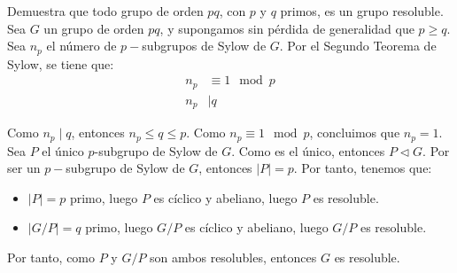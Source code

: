 \begin{ejercicio}\label{ej:5.15}
    Demuestra que todo grupo de orden $pq$, con $p$ y $q$ primos, es un grupo resoluble.\\

    Sea $G$ un grupo de orden $pq$, y supongamos sin pérdida de generalidad que $p\geq q$. Sea $n_p$ el número de $p-$subgrupos de Sylow de $G$. Por el Segundo Teorema de Sylow, se tiene que:
    \begin{align*}
        n_p &\equiv 1 \mod p \\
        n_p &\mid q
    \end{align*}

    Como $n_p\mid q$, entonces $n_p\leq q\leq p$. Como $n_p\equiv 1 \mod p$, concluimos que $n_p=1$. Sea $P$ el único $p$-subgrupo de Sylow de $G$. Como es el único, entonces $P\lhd G$. Por ser un $p-$subgrupo de Sylow de $G$, entonces $|P|=p$. Por tanto, tenemos que:
    \begin{itemize}
        \item $|P|=p$ primo, luego $P$ es cíclico y abeliano, luego $P$ es resoluble.
        \item $|G/P|=q$ primo, luego $G/P$ es cíclico y abeliano, luego $G/P$ es resoluble.
    \end{itemize}
    Por tanto, como $P$ y $G/P$ son ambos resolubles, entonces $G$ es resoluble.
\end{ejercicio}

